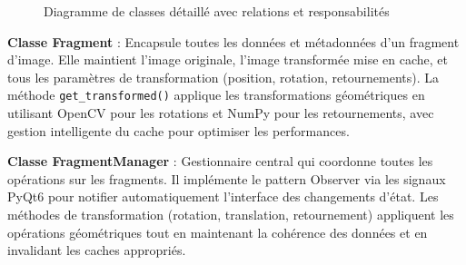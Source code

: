 \begin{figure}[H]
\caption{Diagramme de classes détaillé avec relations et responsabilités}
\end{figure}

\textbf{Classe Fragment} : Encapsule toutes les données et métadonnées d'un fragment d'image. Elle maintient l'image originale, l'image transformée mise en cache, et tous les paramètres de transformation (position, rotation, retournements). La méthode \texttt{get\_transformed()} applique les transformations géométriques en utilisant OpenCV pour les rotations et NumPy pour les retournements, avec gestion intelligente du cache pour optimiser les performances.

\textbf{Classe FragmentManager} : Gestionnaire central qui coordonne toutes les opérations sur les fragments. Il implémente le pattern Observer via les signaux PyQt6 pour notifier automatiquement l'interface des changements d'état. Les méthodes de transformation (rotation, translation, retournement) appliquent les opérations géométriques tout en maintenant la cohérence des données et en invalidant les caches appropriés.

